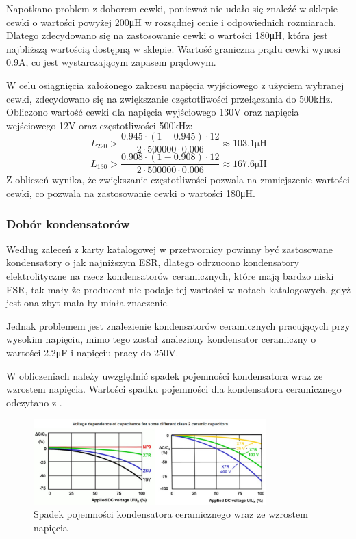 \documentclass[../../main.tex]{subfiles}
\begin{document}
Napotkano problem z doborem cewki, ponieważ nie udało się znaleźć w sklepie cewki o wartości powyżej 200\si{\micro\henry} w rozsądnej cenie i odpowiednich rozmiarach.
Dlatego zdecydowano się na zastosowanie cewki o wartości 180\si{\micro\henry}, która jest najbliższą wartością dostępną w sklepie. Wartość
graniczna prądu cewki wynosi 0.9\si{\ampere}, co jest wystarczającym zapasem prądowym.

W celu osiągnięcia założonego zakresu napięcia wyjściowego z użyciem wybranej cewki, zdecydowano się na zwiększanie częstotliwości przełączania do 500\si{\kilo\hertz}.
Obliczono wartość cewki dla napięcia wyjściowego 130\si{\volt} oraz napięcia wejściowego 12\si{\volt} oraz częstotliwości 500\si{\kilo\hertz}:
\begin{equation}
    L_{220} > \frac{0.945 \cdot (1-0.945) \cdot 12}{2 \cdot 500000 \cdot 0.006} \approx 103.1\si{\micro\henry}
\end{equation}
\begin{equation}
    L_{130} > \frac{0.908 \cdot (1-0.908) \cdot 12}{2 \cdot 500000 \cdot 0.006} \approx 167.6\si{\micro\henry}
\end{equation}
Z obliczeń wynika, że zwiększanie częstotliwości pozwala na zmniejszenie wartości cewki, co pozwala na zastosowanie cewki o wartości 180\si{\micro\henry}.

\subsubsection{Dobór kondensatorów}
Według zaleceń z karty katalogowej w przetwornicy powinny być zastosowane kondensatory o jak najniższym ESR,
dlatego odrzucono kondensatory elektrolityczne na rzecz kondensatorów ceramicznych, które mają bardzo niski ESR, tak
mały że producent nie podaje tej wartości w notach katalogowych, gdyż jest ona zbyt mała by miała znaczenie.

Jednak problemem jest znalezienie kondensatorów ceramicznych pracujących przy wysokim napięciu, mimo tego został znaleziony kondensator 
ceramiczny o wartości 2.2\si{\micro\farad} i napięciu pracy do 250\si{\volt}.

W obliczeniach należy uwzględnić spadek pojemności kondensatora wraz ze wzrostem napięcia.
Wartości spadku pojemności dla kondensatora ceramicznego odczytano z \cite{st:ceramic-capacitor}.
\begin{figure}[H]
    \centering
    \includegraphics[width=0.8\textwidth]{napiecia_c.png}
    \caption{Spadek pojemności kondensatora ceramicznego wraz ze wzrostem napięcia \cite{st:capacitors}}
    \label{fig:napiecia_c}
\end{figure}
\end{document}
